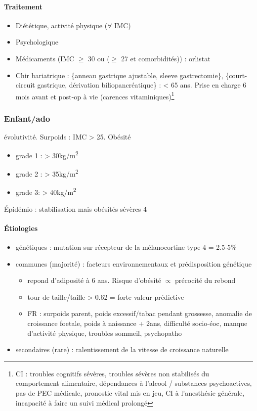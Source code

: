 \documentclass[11pt]{article}
\begin{document}
\paragraph{Traitement}
\label{sec:orgee6fc98}
\begin{itemize}
\item Diététique, activité physique (\(\forall\) IMC)
\item Psychologique
\item Médicaments (IMC \(\ge\) 30 ou (\(\ge\) 27 et comorbidités)) : orlistat
\item Chir bariatrique :  \{anneau gastrique ajustable, sleeve gastrectomie\},
\{court-circuit gastrique, dérivation biliopancréatique\} : < 65 ans. Prise en
charge 6 mois avant et post-op à vie (carences vitaminiques)\footnote{CI : troubles cognitifs sévères, troubles sévères non stabilisés du
comportement alimentaire, dépendances à l'alcool / substances psychoactives, pas
de PEC médicale, pronostic vital mis en jeu, CI à l'anesthésie générale,
incapacité à faire un suivi médical prolongé}
\end{itemize}
\subsubsection{Enfant/ado}
\label{sec:org16431ff}
\danger{} évolutivité. Surpoids : IMC > 25. Obésité 
\begin{itemize}
\item grade 1 : > 30kg/m\textsuperscript{2}
\item grade 2 : > 35kg/m\textsuperscript{2}
\item grade 3: > 40kg/m\textsuperscript{2}
\end{itemize}

Épidémio : stabilisation mais obésités sévères \texttimes{}4

\paragraph{Étiologies}
\label{sec:orgf723b15}
\begin{itemize}
\item génétiques : mutation sur récepteur de la mélanocortine type 4 = 2.5-5\%
\item communes (majorité) : facteurs environnementaux et prédisposition génétique
\begin{itemize}
\item repond d'adiposité à 6 ans. Risque d'obésité \(\propto\) précocité du rebond
\item tour de taille/taille > 0.62 = forte valeur prédictive
\item FR : surpoids parent, poids excessif/tabac pendant grossesse, anomalie de
croissance foetale, \inc\inc poids à naissance + 2ans, difficulté
socio-éoc, manque d'activité physique, troubles sommeil, psychopatho
\end{itemize}
\item secondaires (rare) : ralentissement de la vitesse de croissance naturelle
\end{itemize}
\end{document}
